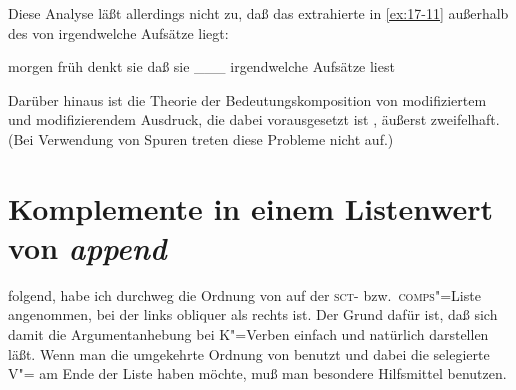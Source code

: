 \documentclass[output=paper]{LSP/langsci}
\begin{document}
{\randnum}Diese Analyse läßt allerdings nicht zu, daß das extrahierte 
in \eqref{ex:17-11} außerhalb des  von {\glqq}irgendwelche Aufsätze{\grqq} liegt:
\begin{exe}
\ex
\label{ex:17-11}
morgen früh denkt sie daß sie \_\_\_ irgendwelche Aufsätze liest
\end{exe}
Darüber hinaus ist die Theorie der Bedeutungskomposition von
modifiziertem und modifizierendem Ausdruck, die dabei vorausgesetzt
ist \citep[Kapitel~8.3]{PollardSag1994}, äußerst zweifelhaft. (Bei Verwendung von
Spuren treten diese Probleme nicht auf.)


\section{Komplemente in einem Listenwert von \textit{append}}

\randnum\label{rn:17-90}\citet{meurers1993a} folgend, habe ich durchweg die Ordnung von \citet{PollardSag1987}
auf der \textsc{sct}-
bzw.\ \textsc{comps}"=Liste angenommen, bei der links obliquer als rechts ist. Der Grund
dafür ist, daß sich damit die Argumentanhebung bei K"=Verben einfach
und natürlich darstellen läßt. Wenn man die umgekehrte Ordnung von
\citet{PollardSag1994} benutzt und dabei die selegierte V"= am Ende der Liste
haben möchte, muß man besondere Hilfsmittel benutzen.
\end{document}
